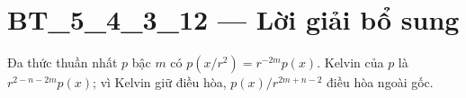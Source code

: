 \documentclass[10pt,a4paper]{article}
\begin{document}
\section*{BT\_5\_4\_3\_12 — Lời giải bổ sung}
Đa thức thuần nhất $p$ bậc $m$ có $p(x/r^2)=r^{-2m}p(x)$. Kelvin của $p$ là $r^{2-n-2m}p(x)$; vì Kelvin giữ điều hòa, $p(x)/r^{2m+n-2}$ điều hòa ngoài gốc.
\end{document}
